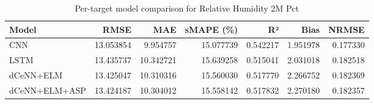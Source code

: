 \begin{table}
\caption{Per-target model comparison for Relative Humidity 2M Pct}
\begin{tabular}{lrrrrrr}
\toprule
Model & RMSE & MAE & sMAPE (\%) & R² & Bias & NRMSE \\
\midrule
CNN & 13.053854 & 9.954757 & 15.077739 & 0.542217 & 1.951978 & 0.177330 \\
LSTM & 13.435737 & 10.342721 & 15.639258 & 0.515041 & 2.031018 & 0.182518 \\
dCeNN+ELM & 13.425047 & 10.310316 & 15.560030 & 0.517770 & 2.266752 & 0.182369 \\
dCeNN+ELM+ASP & 13.424187 & 10.304012 & 15.558142 & 0.517832 & 2.270180 & 0.182357 \\
\bottomrule
\end{tabular}
\end{table}
